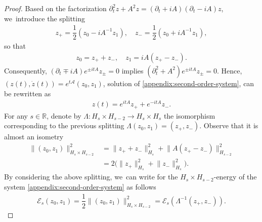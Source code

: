\documentclass[10pt]{amsart}
\theoremstyle{definition}
\let\mc\mathcal
\let\Ld\Lambda
\newcommand{\A}{\mc{A}}
\newcommand{\E}{\mc{E}}
\newcommand{\R}{\mathbb{R}}
\providecommand{\norm}[1]{\lVert#1\rVert}
\begin{document}
\begin{proof}
Based on the factorization $\partial_t^2 z+A^2z=(\partial_t+iA)(\partial_t-iA)z$, we~introduce the splitting
\begin{align*}
z_+=\dfrac{1}{2}(z_0-iA^{-1}z_1),\quad z_-=\dfrac{1}{2}(z_0+iA^{-1}z_1),
\end{align*}
so that
\begin{align*}
z_0=z_++z_-,\quad z_1=iA(z_+-z_-).
\end{align*}
Consequently, $(\partial_t\mp iA)e^{\pm itA}z_{\pm}=0$ implies $(\partial_t^2+A^2)e^{\pm itA}z_{\pm}=0$. Hence, $(z(t), \dot{z}(t))=e^{t\A}(z_0, z_1)$, solution of \eqref{appendix:second-order-system}, can be rewritten as
\begin{align*}
z(t)=e^{itA}z_++e^{-itA}z_-.
\end{align*}
For any $s\in \R$, denote by $\Lambda: H_s\times H_{s-2}\to H_s\times H_s$ the isomorphism corresponding to the previous splitting $\Lambda(z_0, z_1)=(z_+, z_-)$. Observe that it is almost an isometry
\begin{align*}
\norm{(z_0, z_1)}_{H_s\times H_{s-2}}^2&=\norm{z_++z_-}_{H_s}^2+\norm{A(z_+-z_-)}_{H_{s-2}}^2\\&=2\big(\norm{z_+}_{H_s}^2+\norm{z_-}_{H_s}^2\big).
\end{align*}
By considering the above splitting, we~can write for the $H_s\times H_{s-2}$-energy of the system \eqref{appendix:second-order-system} as follows
\begin{align*}
\E_s(z_0, z_1)=\dfrac{1}{2}\norm{(z_0, z_1)}_{H_{s}\times H_{s-2}}^2=\E_s(\Ld^{-1}(z_+, z_-)).
\end{align*}


\end{proof}
\end{document}
